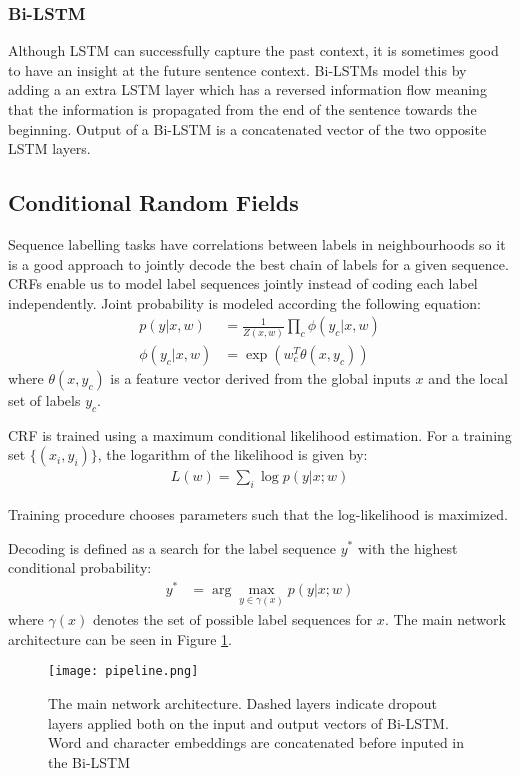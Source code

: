 \subsubsection{Bi-LSTM}
Although LSTM can successfully capture the past context, it is sometimes good
to have an insight at the future sentence context. Bi-LSTMs \cite{bilstm} model
this by adding a an extra LSTM layer which has a reversed information flow
meaning that the information is propagated from the end of the sentence towards
the beginning. Output of a Bi-LSTM is a concatenated vector of the two opposite
LSTM layers.

\subsection{Conditional Random Fields}
Sequence labelling tasks have correlations between labels in neighbourhoods so
it is a good approach to jointly decode the best chain of labels for a given
sequence. CRFs enable us to model label sequences jointly instead of coding
each label independently. Joint probability is modeled according the following
equation:
\begin{align*}
    p(y | x, w) &= \frac{1}{Z(x, w)} \prod_c \phi(y_c | x, w)\\
    \phi(y_c | x, w) &= \exp(w_c^T \theta(x, y_c))
\end{align*}
where $\theta(x, y_c)$ is a feature vector derived from the global inputs $x$
and the local set of labels $y_c$.

CRF is trained using a maximum conditional likelihood estimation. For a
training set $\{(x_i, y_i)\}$, the logarithm of the likelihood is given by:
\begin{align*}
    L(w) = \sum_i \log p(y | x; w)
\end{align*}

Training procedure chooses parameters such that the log-likelihood is
maximized.

Decoding is defined as a search for the label sequence $y^*$ with the highest
conditional probability:
\begin{align*}
    y^* &= \arg\max\limits_{y \in \gamma(x)} p(y | x; w)
\end{align*}
where $\gamma(x)$ denotes the set of possible label sequences for $x$.
The main network architecture can be seen in Figure \ref{fig:pipeline}.

\begin{figure}
  \caption{The main network architecture. Dashed layers indicate dropout layers
  applied both on the input and output vectors of Bi-LSTM. Word and character
  embeddings are concatenated before inputed in the Bi-LSTM}
  \label{fig:pipeline}
  \centering
    \texttt{[image: pipeline.png]}
\end{figure}

